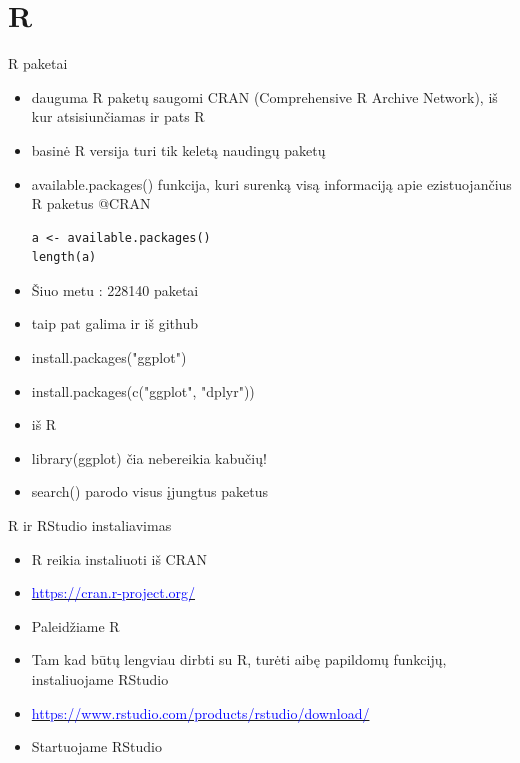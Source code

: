 \documentclass[11pt,xcolor=table]{beamer}
\begin{document}
\section{R}

\begin{frame}[fragile]{R paketai}
\begin{itemize}
\item dauguma R paketų saugomi CRAN (Comprehensive R Archive Network), iš kur atsisiunčiamas ir pats R
\item basinė R versija turi tik keletą naudingų paketų
\item available.packages() funkcija, kuri surenką visą informaciją apie ezistuojančius R paketus @CRAN
\begin{lstlisting}
a <- available.packages()
length(a)
\end{lstlisting}
\item Šiuo metu : 228140 paketai
\item taip pat galima ir iš github
\item install.packages("ggplot")
\item  install.packages(c("ggplot", "dplyr"))
\item iš R 
\item library(ggplot) čia nebereikia kabučių!
\item search() parodo visus įjungtus paketus
\end{itemize}
\end{frame}
\begin{frame}{R ir RStudio instaliavimas}
\begin{itemize}
\item R reikia instaliuoti iš CRAN
\item \href{https://cran.r-project.org/}{\textcolor{blue}{https://cran.r-project.org/}}
\item Paleidžiame R 
\item Tam kad būtų lengviau dirbti su R, turėti aibę papildomų funkcijų, instaliuojame RStudio
\item \href{https://www.rstudio.com/products/rstudio/download/}{\textcolor{blue}{https://www.rstudio.com/products/rstudio/download/}}
\item Startuojame RStudio
\end{itemize}
\end{frame}
\end{document}
